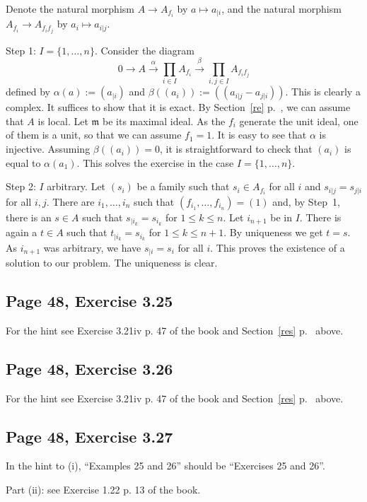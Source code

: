 \documentclass[parskip=half,fontsize=12pt]{scrartcl}%
\newcommand{\mf}{\mathfrak}
\newcommand{\mmm}{\mf m}
\newcommand{\xr}{\xrightarrow}
\begin{document}
Denote the natural morphism $A\to A_{f_i}$ by $a\mapsto a_{|i}$, and the natural morphism $A_{f_i}\to A_{f_if_j}$ by $a_i\mapsto a_{i|j}$. 

Step 1: $I=\{1,\dots,n\}$. Consider the diagram 
$$
0\to A\xr\alpha\prod_{i\in I}A_{f_i}\xr\beta\prod_{i,j\in I}A_{f_if_j}
$$ 
defined by $\alpha(a):=(a_{|i})$ and $\beta((a_i)):=((a_{i|j}-a_{j|i}))$. This is clearly a complex. It suffices to show that it is exact. By Section~\ref{re} p.~\pageref{re}, we can assume that $A$ is local. Let $\mmm$ be its maximal ideal. As the $f_i$ generate the unit ideal, one of them is a unit, so that we can assume $f_1=1$. It is easy to see that $\alpha$ is injective. Assuming $\beta((a_i))=0$, it is straightforward to check that $(a_i)$ is equal to $\alpha(a_1)$. This solves the exercise in the case $I=\{1,\dots,n\}$.

Step 2: $I$ arbitrary. Let $(s_i)$ be a family such that $s_i\in A_{f_i}$ for all $i$ and $s_{i|j}=s_{j|i}$ for all $i,j$. There are $i_1,\dots,i_n$ such that $(f_{i_1},\dots,f_{i_n})=(1)$ and, by Step~1, there is an $s\in A$ such that $s_{|i_k}=s_{i_k}$ for $1\le k\le n$. Let $i_{n+1}$ be in $I$. There is again a $t\in A$ such that $t_{|i_k}=s_{i_k}$ for $1\le k\le n+1$. By uniqueness we get $t=s$. As $i_{n+1}$ was arbitrary, we have $s_{|i}=s_i$ for all $i$. This proves the existence of a solution to our problem. The uniqueness is clear.

\subsection{Page 48, Exercise 3.25}%

For the hint see Exercise 3.21iv p. 47 of the book and Section~\ref{res} p.~\pageref{res} above.

\subsection{Page 48, Exercise 3.26}%

For the hint see Exercise 3.21iv p. 47 of the book and Section~\ref{res} p.~\pageref{res} above.

\subsection{Page 48, Exercise 3.27}%

In the hint to (i), ``Examples 25 and 26'' should be ``Exercises 25 and 26''. 

Part (ii): see Exercise 1.22 p. 13 of the book. 
\end{document}
